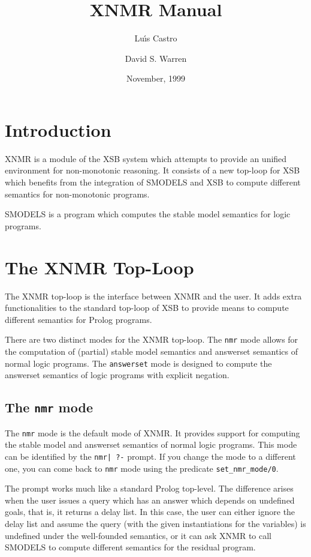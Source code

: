 \documentclass{article}
\title{XNMR Manual}
\author{Lu\'\i s Castro \and David S. Warren}
\date{November, 1999}
\begin{document}
\maketitle
\section{Introduction}

XNMR is a module of the XSB system which attempts to provide an
unified environment for non-monotonic reasoning. It consists of a new
top-loop for XSB which benefits from the integration of SMODELS and
XSB to compute different semantics for non-monotonic programs.

SMODELS is a program which computes the stable model semantics for
logic programs. 

\section{The XNMR Top-Loop}

The XNMR top-loop is the interface between XNMR and the user. It adds
extra functionalities to the standard top-loop of XSB to provide means
to compute different semantics  for Prolog programs.

There are two distinct modes for the XNMR top-loop. The \texttt{nmr}
mode allows for the computation of (partial) stable model semantics
and answerset semantics of normal logic programs. The
\texttt{answerset} mode is designed to compute the answerset semantics
of logic programs with explicit negation.

\subsection{The \texttt{nmr} mode}

The \texttt{nmr} mode is the default mode of XNMR. It provides support
for computing the stable model and answerset semantics of normal logic
programs. This mode can be identified by the \verb#nmr| ?-# prompt. If
you change the mode to a different one, you can come back to
\texttt{nmr} mode using the predicate \texttt{set\_nmr\_mode/0}.

The prompt works much like a standard Prolog top-level. The difference
arises when the user issues a query which has an answer which depends
on undefined goals, that is, it returns a delay list. In this case,
the user can either ignore the delay list and assume the query (with
the given instantiations for the variables) is undefined under the
well-founded semantics, or it can ask XNMR to call SMODELS to compute
different semantics for the residual program.
\end{document}
